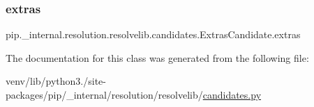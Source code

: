 \subsubsection{\texorpdfstring{extras}{extras}}
{\footnotesize\ttfamily pip.\+\_\+internal.\+resolution.\+resolvelib.\+candidates.\+Extras\+Candidate.\+extras\hspace{0.3cm}{\ttfamily [static]}}



The documentation for this class was generated from the following file\+:\begin{DoxyCompactItemize}
\item 
venv/lib/python3./site-\/packages/pip/\+\_\+internal/resolution/resolvelib/\hyperlink{candidates_8py}{candidates.\+py}\end{DoxyCompactItemize}
